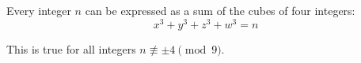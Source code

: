 \begin{conjecture}
    Every integer $n$ can be expressed as a sum of the cubes of four integers:
\[
    x^3+y^3+z^3+w^3=n
\]
\end{conjecture}

\begin{proposition}
    This is true for all integers $n\not\equiv\pm4\pmod9$.
\end{proposition}
